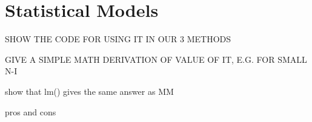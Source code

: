 \chapter{Statistical Models}  
\label{chap:mixed} 

SHOW THE CODE FOR USING IT IN OUR 3 METHODS

GIVE A SIMPLE MATH DERIVATION OF VALUE OF IT, E.G. FOR SMALL N-I

show that lm() gives the same answer as MM

pros and cons


